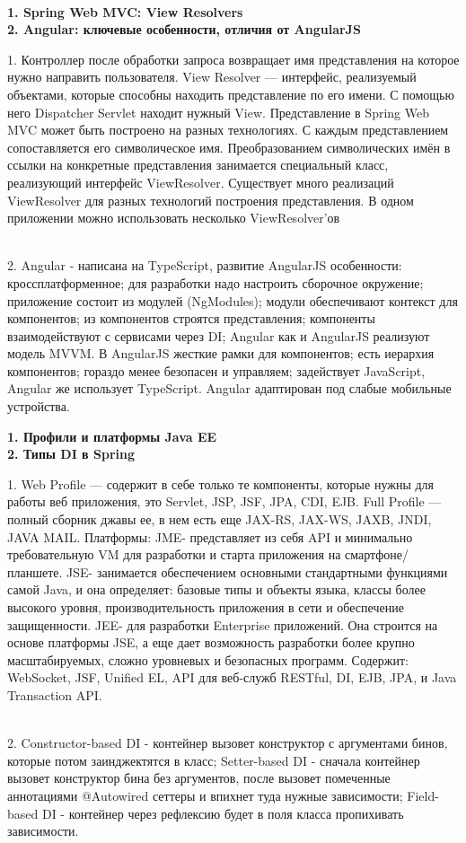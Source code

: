 \documentclass{article}
\newcommand{\bil}[4]{%
    \begin{minipage}{.3\textwidth}
        \textbf{1. #1} \\
        \textbf{2. #2}

        1. #3
        \\
        2. #4
    \end{minipage}
}
\begin{document}
\\
\bil{Spring Web MVC: View Resolvers}{Angular: ключевые особенности, отличия от AngularJS}{
    Контроллер после обработки запроса возвращает имя представления на которое нужно направить пользователя. View Resolver — интерфейс, реализуемый объектами, которые способны находить представление по его имени. 
    С помощью него Dispatcher Servlet находит нужный View.
    Представление в Spring Web MVC может быть построено на разных технологиях.
    С каждым представлением сопоставляется его символическое имя.
    Преобразованием символических имён в ссылки на конкретные представления занимается специальный класс, реализующий интерфейс ViewResolver. 
    Существует много реализаций ViewResolver для разных технологий построения представления. 
    В одном приложении можно использовать несколько ViewResolver'ов
}{
    Angular - написана на TypeScript, развитие AngularJS
    особенности:
    кроссплатформенное;
    для разработки надо настроить сборочное окружение;
    приложение состоит из модулей (NgModules);
    модули обеспечивают контекст для компонентов;
    из компонентов строятся представления;
    компоненты взаимодействуют с сервисами через DI;
    Angular как и AngularJS реализуют модель MVVM.
    В AngularJS жесткие рамки для компонентов; есть иерархия компонентов; гораздо менее безопасен и управляем; задействует JavaScript, Angular же использует TypeScript.
    Angular адаптирован под слабые мобильные устройства.

}
\hfill
\bil{Профили и платформы Java EE}{Типы DI в Spring}{
    Web Profile — содержит в себе только те компоненты, которые нужны для работы веб приложения, это Servlet, JSP, JSF, JPA, CDI, EJB.
Full Profile — полный сборник джавы ее, в нем есть еще JAX-RS, JAX-WS, JAXB, JNDI, JAVA MAIL.
Платформы: JME- представляет из себя API и минимально требовательную VM для разработки и старта приложения на смартфоне/планшете. JSE- занимается обеспечением основными стандартными функциями самой Java, и она определяет: базовые типы и объекты языка, классы более высокого уровня, 
производительность приложения в сети и обеспечение защищенности.
JEE- для разработки Enterprise приложений. Она строится на основе платформы JSE, а еще дает возможность разработки более крупно масштабируемых, сложно уровневых и безопасных программ. Содержит: WebSocket, JSF, Unified EL, API для веб-служб RESTful, DI, EJB, JPA, и Java Transaction API.
}{
    Constructor-based DI - контейнер вызовет конструктор с аргументами бинов, которые потом заинджектятся в класс; Setter-based DI - сначала контейнер вызовет конструктор бина без аргументов, после вызовет помеченные аннотациями @Autowired сеттеры и впихнет туда нужные зависимости; 
    Field-based DI - контейнер через рефлексию будет в поля класса пропихивать зависимости.
}
\end{document}
